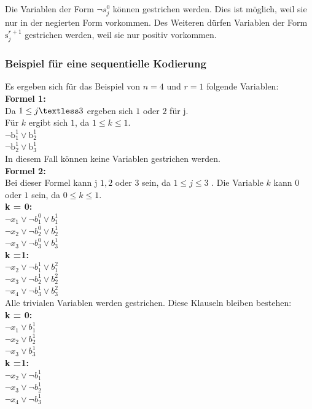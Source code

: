 \documentclass[a4,abstract=on]{scrartcl}
\begin{document}
Die Variablen der Form  $\neg s_j^0$ können gestrichen werden. Dies ist möglich, weil sie nur in der negierten Form vorkommen. Des Weiteren dürfen Variablen der Form $\text{s}_j^{r+1}$ gestrichen werden, weil sie nur positiv vorkommen.

	\subsubsection{Beispiel für eine sequentielle Kodierung}
Es ergeben sich für das Beispiel von $n=4$ und $r=1$ folgende Variablen:\\
\textbf{Formel 1:}\\
Da $1 \leq j \textless 3$ ergeben sich $1$ oder $2$ für j.\\
Für $k$ ergibt sich $1$, da $1 \leq k \leq 1$.\\
$\neg \text{b}_1^1 \vee \text{b}_2^1$\\
$\neg  \text{b}_2^1 \vee \text{b}_3^1$\\
In diesem Fall können keine Variablen gestrichen werden.\\

\textbf{Formel 2:}\\
Bei dieser Formel kann j $1, 2$ oder $3$ sein, da $1 \leq j \leq 3$ . Die Variable $k$ kann $0$ oder $1$ sein, da $0 \leq k \leq 1$.\\
\textbf{k = 0:}\\
$\neg x_1 \vee \neg b_1^0 \vee b_1^1$\\
$\neg x_2 \vee \neg b_2^0 \vee b_2^1$\\
$\neg x_3 \vee \neg b_3^0 \vee b_3^1$\\
\textbf{k =1:}\\
$\neg x_2 \vee \neg b_1^1 \vee b_1^2$\\
$\neg x_3 \vee \neg b_2^1 \vee b_2^2$\\
$\neg x_4 \vee \neg b_3^1 \vee b_3^2$\\

Alle trivialen Variablen werden gestrichen. Diese Klauseln bleiben bestehen:\\
\textbf{k = 0:}\\
$\neg x_1 \vee b_1^1$\\
$\neg x_2 \vee b_2^1$\\
$\neg x_3 \vee b_3^1$\\
\textbf{k =1:}\\
$\neg x_2 \vee \neg b_1^1 $\\
$\neg x_3 \vee \neg b_2^1 $\\
$\neg x_4 \vee \neg b_3^1 $\\
\end{document}
